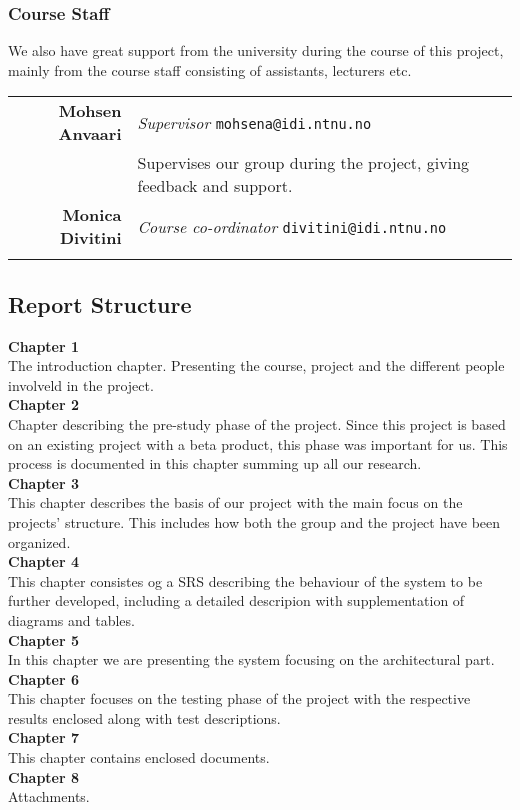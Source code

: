 \subsubsection{Course Staff}
We also have great support from the university during the course of this project, mainly from the course staff consisting of assistants, lecturers etc.

\begin{tabular}{r|p{11cm}}
\textbf{Mohsen Anvaari} & \emph{Supervisor}   \texttt{mohsena@idi.ntnu.no}\\[6pt]
& Supervises our group during the project, giving feedback and support. \\[8pt]
\textbf{Monica Divitini} & \emph{Course co-ordinator}   \texttt{divitini@idi.ntnu.no}\\[6pt]
& \todo{?}\\
\end{tabular}

\subsection{Report Structure}

\textbf{Chapter 1}\\
 The introduction chapter. Presenting the course, project and the different people involveld in the project.\\[20pt]
\textbf{Chapter 2}\\
Chapter describing the pre-study phase of the project. Since this project is based on an existing project with a beta product, this phase was important for us. This process is documented in this chapter summing up all our research. \\[20pt]
\textbf{Chapter 3}\\
This chapter describes the basis of our project with the main focus on the projects' structure. This includes how both the group and the project have been organized.\\[20pt]
\textbf{Chapter 4}\\
 This chapter consistes og a SRS describing the behaviour of the system to be further developed, including a detailed descripion with supplementation of diagrams and tables.\\[20pt]
\textbf{Chapter 5}\\
In this chapter we are presenting the system focusing on the architectural part.\\[20pt]
\textbf{Chapter 6}\\
This chapter focuses on the testing phase of the project with the respective results enclosed along with test descriptions.\\[20pt]
\textbf{Chapter 7}\\
 This chapter contains enclosed documents.\\[20pt]
 \textbf{Chapter 8}\\
Attachments.\\

